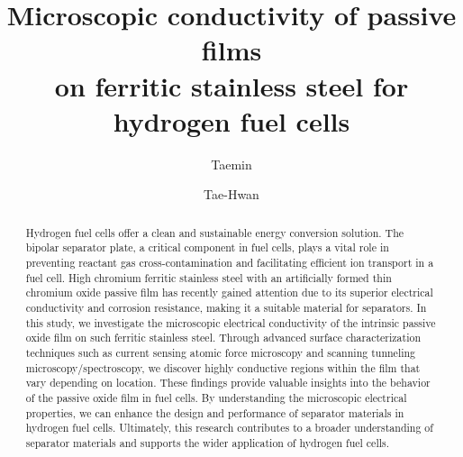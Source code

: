 \documentclass[jkps,reprint,twocolumn,showkeys]{revtex4}
\begin{document}
\title[]{Microscopic conductivity of passive films\\ on ferritic stainless steel for hydrogen fuel cells}

\author{Taemin }
\author{Tae-Hwan }%


\begin{abstract}
Hydrogen fuel cells offer a clean and sustainable energy conversion solution. 
The bipolar separator plate, a critical component in fuel cells, plays a vital role in preventing reactant gas cross-contamination and facilitating efficient ion transport in a fuel cell. 
High chromium ferritic stainless steel with an artificially formed thin chromium oxide passive film has recently gained attention due to its superior electrical conductivity and corrosion resistance, making it a suitable material for separators.
In this study, we investigate the microscopic electrical conductivity of the intrinsic passive oxide film on such ferritic stainless steel. 
Through advanced surface characterization techniques such as current sensing atomic force microscopy and scanning tunneling microscopy/spectroscopy, we discover highly conductive regions within the film that vary depending on location. 
These findings provide valuable insights into the behavior of the passive oxide film in fuel cells. 
By understanding the microscopic electrical properties, we can enhance the design and performance of separator materials in hydrogen fuel cells. 
Ultimately, this research contributes to a broader understanding of separator materials and supports the wider application of hydrogen fuel cells.
\end{abstract}




\maketitle

\clearpage
{} 
\end{document}
